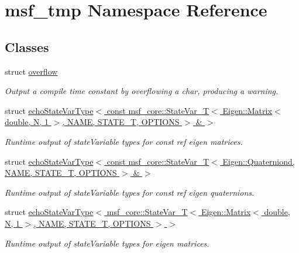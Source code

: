 \hypertarget{namespacemsf__tmp}{\section{msf\-\_\-tmp Namespace Reference}
\label{namespacemsf__tmp}
}
\subsection*{Classes}
\begin{DoxyCompactItemize}
\item 
struct \hyperlink{structmsf__tmp_1_1overflow}{overflow}
\begin{DoxyCompactList}\small\item\em Output a compile time constant by overflowing a char, producing a warning. \end{DoxyCompactList}\item 
struct \hyperlink{structmsf__tmp_1_1echoStateVarType_3_01const_01msf__core_1_1StateVar__T_3_01Eigen_1_1Matrix_3_01f7a55ffb559c20f31cb06a2ee67f7cdd}{echo\-State\-Var\-Type$<$ const msf\-\_\-core\-::\-State\-Var\-\_\-\-T$<$ Eigen\-::\-Matrix$<$ double, N, 1 $>$, N\-A\-M\-E, S\-T\-A\-T\-E\-\_\-\-T, O\-P\-T\-I\-O\-N\-S $>$ \& $>$}
\begin{DoxyCompactList}\small\item\em Runtime output of state\-Variable types for const ref eigen matrices. \end{DoxyCompactList}\item 
struct \hyperlink{structmsf__tmp_1_1echoStateVarType_3_01const_01msf__core_1_1StateVar__T_3_01Eigen_1_1Quaterniond7114362e0351fe52a4a010b178818803}{echo\-State\-Var\-Type$<$ const msf\-\_\-core\-::\-State\-Var\-\_\-\-T$<$ Eigen\-::\-Quaterniond, N\-A\-M\-E, S\-T\-A\-T\-E\-\_\-\-T, O\-P\-T\-I\-O\-N\-S $>$ \& $>$}
\begin{DoxyCompactList}\small\item\em Runtime output of state\-Variable types for const ref eigen quaternions. \end{DoxyCompactList}\item 
struct \hyperlink{structmsf__tmp_1_1echoStateVarType_3_01msf__core_1_1StateVar__T_3_01Eigen_1_1Matrix_3_01double_0de9def0e1695f00da0e5db77a247f121}{echo\-State\-Var\-Type$<$ msf\-\_\-core\-::\-State\-Var\-\_\-\-T$<$ Eigen\-::\-Matrix$<$ double, N, 1 $>$, N\-A\-M\-E, S\-T\-A\-T\-E\-\_\-\-T, O\-P\-T\-I\-O\-N\-S $>$ $>$}
\begin{DoxyCompactList}\small\item\em Runtime output of state\-Variable types for eigen matrices. \end{DoxyCompactList}\item 

\end{DoxyCompactItemize}
